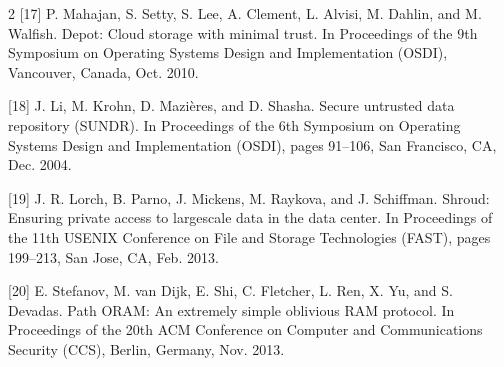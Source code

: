 \documentclass[12pt,a4paper]{article}
\begin{document}
\begin{multicols}{2}
[17] P. Mahajan, S. Setty, S. Lee, A. Clement, L. Alvisi, M. Dahlin, and M. Walfish. Depot: Cloud storage with minimal trust. In Proceedings of the 9th Symposium on Operating Systems Design and Implementation (OSDI), Vancouver, Canada, Oct. 2010.

[18] J. Li, M. Krohn, D. Mazières, and D. Shasha. Secure untrusted data repository (SUNDR). In Proceedings of the 6th Symposium on Operating Systems Design and Implementation (OSDI), pages 91–106, San Francisco, CA, Dec. 2004.

[19] J. R. Lorch, B. Parno, J. Mickens, M. Raykova, and J. Schiffman. Shroud: Ensuring private access to largescale data in the data center. In Proceedings of the 11th USENIX Conference on File and Storage Technologies (FAST), pages 199–213, San Jose, CA, Feb. 2013.

[20] E. Stefanov, M. van Dijk, E. Shi, C. Fletcher, L. Ren, X. Yu, and S. Devadas. Path ORAM: An extremely simple oblivious RAM protocol. In Proceedings of the 20th ACM Conference on Computer and Communications Security (CCS), Berlin, Germany, Nov. 2013.
\end{multicols}
\end{document}
